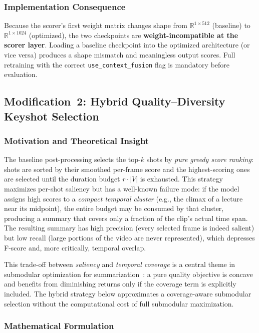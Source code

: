 \documentclass[10pt,conference]{IEEEtran}
\begin{document}
\subsubsection{Implementation Consequence}

Because the scorer's first weight matrix changes shape from
$\mathbb{R}^{1 \times 512}$ (baseline) to $\mathbb{R}^{1 \times 1024}$
(optimized), the two checkpoints are \textbf{weight-incompatible at the scorer
layer}. Loading a baseline checkpoint into the optimized architecture (or
vice versa) produces a shape mismatch and meaningless output scores. Full
retraining with the correct \texttt{use\_context\_fusion} flag is mandatory
before evaluation.

\subsection{Modification~2: Hybrid Quality--Diversity Keyshot Selection}

\subsubsection{Motivation and Theoretical Insight}

The baseline post-processing selects the top-$k$ shots by \emph{pure greedy
score ranking}: shots are sorted by their smoothed per-frame score and the
highest-scoring ones are selected until the duration budget $r \cdot |V|$ is
exhausted. This strategy maximizes per-shot saliency but has a well-known
failure mode: if the model assigns high scores to a \emph{compact temporal
cluster} (e.g., the climax of a lecture near its midpoint), the entire budget
may be consumed by that cluster, producing a summary that covers only a
fraction of the clip's actual time span. The resulting summary has high
precision (every selected frame is indeed salient) but low recall (large
portions of the video are never represented), which depresses F-score and,
more critically, temporal overlap.

This trade-off between \emph{saliency} and \emph{temporal coverage} is a
central theme in submodular optimization for summarization~\cite{gygli2015submodular,lin2011submodular}: a
pure quality objective is concave and benefits from diminishing returns only
if the coverage term is explicitly included. The hybrid strategy below
approximates a coverage-aware submodular selection without the computational
cost of full submodular maximization.

\subsubsection{Mathematical Formulation}
\end{document}
